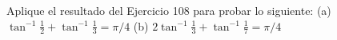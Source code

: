 \item Aplique el resultado del Ejercicio 108 para probar lo siguiente:
    (a) $\tan^{-1} \frac{1}{2} + \tan^{-1} \frac{1}{3} = \pi/4$ \qquad (b) $2 \tan^{-1} \frac{1}{3} + \tan^{-1} \frac{1}{7} = \pi/4$

